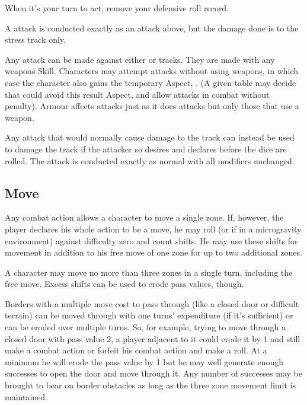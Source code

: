 When it's your turn to act, remove your defensive roll record.



A \Composure{} attack is conducted exactly as an attack above, but the damage done is to the \Composure{} stress track only.

Any attack can be made against either \Composure{} or \Health{} tracks. They are made with any weapons Skill. Characters may attempt \Composure{} attacks without using weapons, in which case the character also gains the temporary Aspect, . (A given table may decide that  could avoid this result Aspect, and allow  attacks in combat without penalty). Armour affects \Composure{} attacks just as it does \Health{} attacks but only those that use a weapon.

Any attack that would normally cause damage to the \Health{} track can instead be used to damage the \Composure{} track if the attacker so desires and declares before the dice are rolled. The attack is conducted exactly as normal with all modifiers unchanged.


\subsection{Move}\label{sec:personal-combat-move}

Any combat action allows a character to move a single zone. If, however, the player declares his whole action to be a move, he may roll  (or  if in a microgravity environment) against difficulty zero and count shifts. He may use these shifts for movement in addition to his free move of one zone for up to two additional zones.

A character may move no more than three zones in a single turn, including the free move. Excess shifts can be used to erode pass values, though.

Borders with a multiple move cost to pass through (like a closed door or difficult terrain) can be moved through with one turns' expenditure (if it's sufficient) or can be eroded over multiple turns. So, for example, trying to move through a closed door with pass value 2, a player adjacent to it could erode it by 1 and still make a combat action or forfeit his combat action and make a  roll. At a minimum he will erode the pass value by 1 but he may well generate enough successes to open the door and move through it. Any number of successes may be brought to bear on border obstacles as long as the three zone movement limit is maintained.

